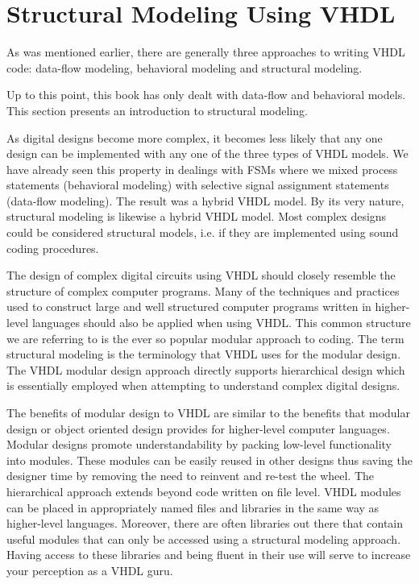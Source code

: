 %
%
%
\chapter{Structural Modeling Using VHDL}
As was mentioned earlier, there are generally three approaches to writing VHDL code: data-flow modeling, behavioral modeling and structural modeling.

Up to this point, this book has only dealt with data-flow and behavioral models. This section presents an introduction to structural modeling. 

As digital designs become more complex, it becomes less likely that any one design can be implemented with any one of the three types of VHDL models. We have already seen this property in dealings with FSMs where we mixed process statements (behavioral modeling) with selective signal assignment statements (data-flow modeling). The result was a hybrid VHDL model. By its very nature, structural modeling is likewise a hybrid VHDL model. Most complex designs could be considered structural models, i.e. if they are implemented using sound coding procedures. 

The design of complex digital circuits using VHDL should closely resemble the structure of complex computer programs. Many of the techniques and practices used to construct large and well structured computer programs written in higher-level languages should also be applied when using VHDL. This common structure we are referring to is the ever so popular modular approach to coding. The term structural modeling is the terminology that VHDL uses for the modular design. The VHDL modular design approach directly supports hierarchical design which is essentially employed when attempting to understand complex digital designs. 

The benefits of modular design to VHDL are similar to the benefits that modular design or object oriented design provides for higher-level computer languages. Modular designs promote understandability by packing low-level functionality into modules. These modules can be easily reused in other designs thus saving the designer time by removing the need to reinvent and re-test the wheel. The hierarchical approach extends beyond code written on file level. VHDL modules can be placed in appropriately named files and libraries in the same way as higher-level languages. Moreover, there are often libraries out there that contain useful modules that can only be accessed using a structural modeling approach. Having access to these libraries and being fluent in their use will serve to increase your perception as a VHDL guru.

